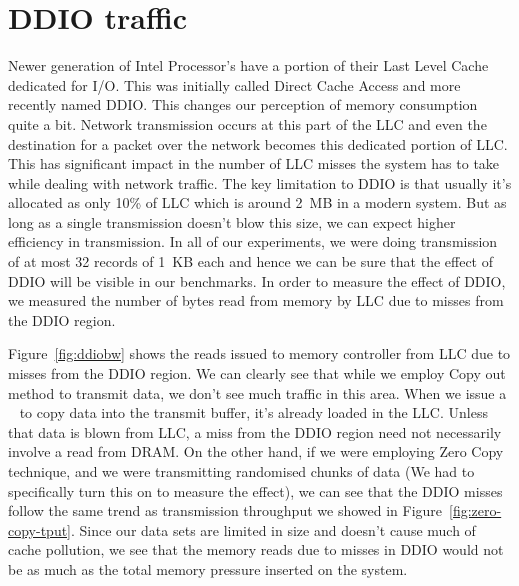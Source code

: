 \section{DDIO traffic}

Newer generation of Intel Processor's have a portion of their Last Level Cache dedicated for I/O. This was initially called Direct Cache Access\textregistered 
and more recently named DDIO\textregistered. This changes our perception of memory consumption quite a bit. Network transmission occurs at this part of the LLC 
and even the destination for a packet over the network becomes this dedicated portion of LLC. This has significant impact in the number of LLC misses the system 
has to take while dealing with network traffic. The key limitation to DDIO is that usually it's allocated as only 10\% of LLC which is around 2~MB in a modern system. 
But as long as a single transmission doesn't blow this size, we can expect higher efficiency in transmission. In all of our experiments, we were doing transmission of 
at most 32 records of 1~KB each and hence we can be sure that the effect of DDIO will be visible in our benchmarks. In order to measure the 
effect of DDIO, we measured the number of bytes read from memory by LLC due to misses from the DDIO region. 

Figure~\ref{fig:ddiobw} shows the reads issued to memory controller from LLC due to misses from the  DDIO region. We can clearly see that while we employ Copy out 
method to transmit data, we don't see much traffic in this area. When we issue a \memcpy~ to copy data into the transmit buffer, it's already loaded in the LLC. 
Unless that data is blown from LLC, a miss from the DDIO region need not necessarily involve a read from DRAM. On the other hand, if we were employing Zero Copy technique, 
and we were transmitting randomised chunks of data (We had to specifically turn this on to measure the effect), we can see that the DDIO misses follow the same trend 
as transmission throughput we showed in Figure~\ref{fig:zero-copy-tput}. Since our data sets are limited in size and doesn't cause much of cache pollution, we see that the 
memory reads due to misses in DDIO would not be as much as the total memory pressure inserted on the system. 

